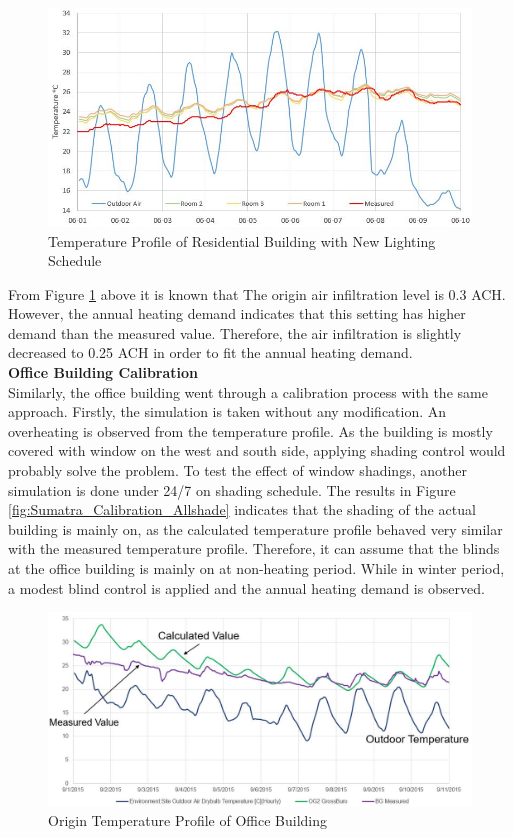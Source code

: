 \documentclass[a4paper, oneside]{discothesis}
\begin{document}
			
			\begin{figure}[H]
			\centering
			\includegraphics[scale=0.5]{Hongg_Clibration_03NewLight.JPG}
			\caption{Temperature Profile of Residential Building with New Lighting Schedule}
			\label{fig:HonggerCalibrationNewLight}
			\end{figure}
			
			From Figure \ref{fig:HonggerCalibrationNewLight} above it is known that
			The origin air infiltration level is 0.3 ACH. However, the annual heating demand indicates that this setting has higher demand than the measured value. Therefore, the air infiltration is slightly decreased to 0.25 ACH in order to fit the annual heating demand.\\ 

			\textbf{Office Building Calibration}\\
			Similarly, the office building went through a calibration process with the same approach. Firstly, the simulation is taken without any modification. An overheating is observed from the temperature profile. As the building is mostly covered with window on the west and south side, applying shading control would probably solve the problem. To test the effect of window shadings, another simulation is done under 24/7  on shading schedule. The results in Figure \ref{fig:Sumatra_Calibration_Allshade} indicates that the shading of the actual building is mainly on, as the calculated temperature profile behaved very similar with the measured temperature profile. Therefore, it can assume that the blinds at the office building is mainly on at non-heating period. While in winter period, a modest blind control is applied and the annual heating demand is observed.

			\begin{figure}[H]
			\centering
			\includegraphics[scale=0.35]{figures/Office_Calibration_Ori.JPG}
			\caption{Origin Temperature Profile of Office Building}
			\label{fig:Sumatra_Calibration_Ori}
			\end{figure}
			
\end{document}

